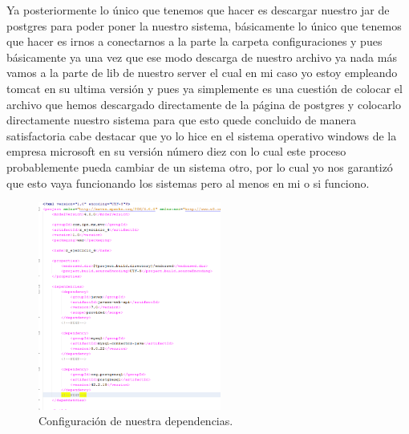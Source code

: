 \documentclass[10pt,a4paper]{article}
\begin{document}
Ya posteriormente lo único que tenemos que hacer es descargar nuestro jar de postgres para poder poner la nuestro sistema, básicamente lo único que tenemos que hacer es irnos a conectarnos a la parte la carpeta configuraciones y pues básicamente ya una vez que ese modo descarga de nuestro archivo ya nada más vamos a la parte de lib de nuestro server el cual en mi caso yo estoy empleando tomcat en su ultima versión y pues ya simplemente es una cuestión de colocar el archivo que hemos descargado directamente de la página de postgres y colocarlo directamente nuestro sistema para que esto quede concluido de manera satisfactoria cabe destacar que yo lo hice en el sistema operativo windows de la empresa microsoft en su versión número diez con lo cual este proceso probablemente pueda cambiar de un sistema otro, por lo cual yo nos garantizó que esto vaya funcionando los sistemas pero al menos en mi o si funciono.
\begin{figure}[h]
\centering
\includegraphics[width=6cm]{2XX}
\caption{Configuración de nuestra dependencias.}
\label{fig:re1}
\end{figure}
\vspace{60mm}
\end{document}
